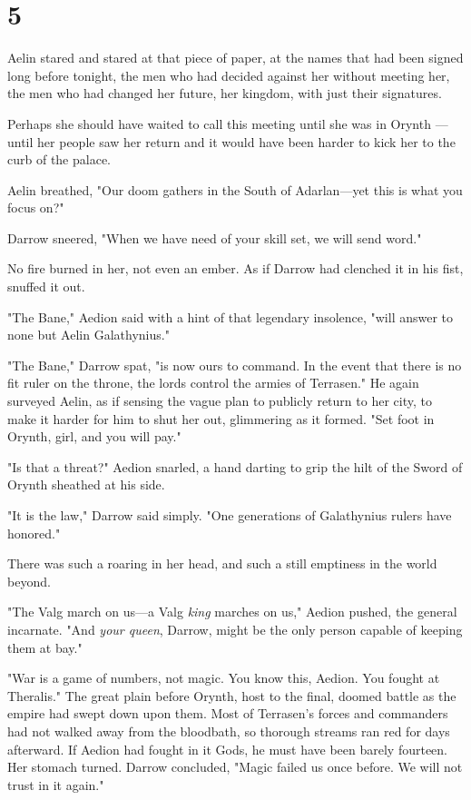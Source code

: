 
\chapter{5}

Aelin stared and stared at that piece of paper, at the names that had been signed long before tonight, the men who had decided against her without meeting her, the men who had changed her future, her kingdom, with just their signatures.

Perhaps she should have waited to call this meeting until she was in Orynth ---until her people saw her return and it would have been harder to kick her to the curb of the palace.

Aelin breathed, "Our doom gathers in the South of Adarlan---yet this is what you focus on?"

Darrow sneered, "When we have need of your  skill set, we will send word."

No fire burned in her, not even an ember. As if Darrow had clenched it in his fist, snuffed it out.

"The Bane," Aedion said with a hint of that legendary insolence, "will answer to none but Aelin Galathynius."

"The Bane," Darrow spat, "is now ours to command. In the event that there is no fit ruler on the throne, the lords control the armies of Terrasen." He again surveyed Aelin, as if sensing the vague plan to publicly return to her city, to make it harder for him to shut her out, glimmering as it formed. "Set foot in Orynth, girl, and you will pay."

"Is that a threat?" Aedion snarled, a hand darting to grip the hilt of the Sword of Orynth sheathed at his side.

"It is the law," Darrow said simply. "One generations of Galathynius rulers have honored."

There was such a roaring in her head, and such a still emptiness in the world beyond.

"The Valg march on us---a Valg \emph{king} marches on us," Aedion pushed, the general incarnate. "And \emph{your queen}, Darrow, might be the only person capable of keeping them at bay."

"War is a game of numbers, not magic. You know this, Aedion. You fought at Theralis." The great plain before Orynth, host to the final, doomed battle as the empire had swept down upon them. Most of Terrasen's forces and commanders had not walked away from the bloodbath, so thorough streams ran red for days afterward. If Aedion had fought in it 
Gods, he must have been barely fourteen. Her stomach turned. Darrow concluded, "Magic failed us once before. We will not trust in it again."

